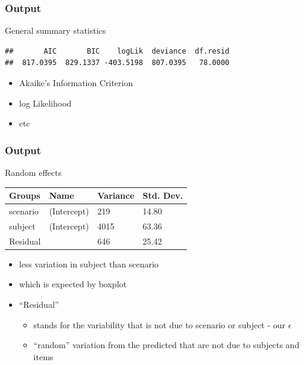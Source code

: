 \documentclass[10p]{beamer}\usepackage[]{graphicx}\usepackage[]{color}
\makeatletter
\newenvironment{kframe}{%
 \def\at@end@of@kframe{}%
 \ifinner\ifhmode%
  \def\at@end@of@kframe{\end{minipage}}%
  \begin{minipage}{\columnwidth}%
 \fi\fi%
 \def\FrameCommand##1{\hskip\@totalleftmargin \hskip-\fboxsep
 \colorbox{shadecolor}{##1}\hskip-\fboxsep
     \hskip-\linewidth \hskip-\@totalleftmargin \hskip\columnwidth}%
 \MakeFramed {\advance\hsize-\width
   \@totalleftmargin\z@ \linewidth\hsize
   \@setminipage}}%
 {\par\unskip\endMakeFramed%
 \at@end@of@kframe}
\newenvironment{knitrout}{}{} %
\makeatother
\begin{document}
\begin{frame}[fragile]
\frametitle{Output}
General summary statistics
\begin{knitrout}\scriptsize
{}\color{fgcolor}\begin{kframe}
\begin{verbatim}
##       AIC       BIC    logLik  deviance  df.resid 
##  817.0395  829.1337 -403.5198  807.0395   78.0000
\end{verbatim}
\end{kframe}
\end{knitrout}
\begin{itemize}
\item Akaike's Information Criterion
\item log Likelihood
\item etc
\end{itemize}
\end{frame}

\begin{frame}
\frametitle{Output}

Random effects

\vspace{9pt}
\begin{tabular}{llll}

\toprule
Groups & Name & Variance & Std. Dev. \\
\midrule
scenario & (Intercept) & 219 & 14.80 \\
subject & (Intercept) & 4015 & 63.36 \\
Residual & & 646 & 25.42 \\
\bottomrule
\end{tabular}
\begin{itemize}
\item less variation in subject than scenario
\item which is expected by boxplot
\item ``Residual'' 
	\begin{itemize}
	\item stands for the variability that is not due to scenario or subject - our $\epsilon$
	\item ``random'' variation from the predicted that are not due to subjects and items
	\end{itemize}
\end{itemize}
\end{frame}
\end{document}

